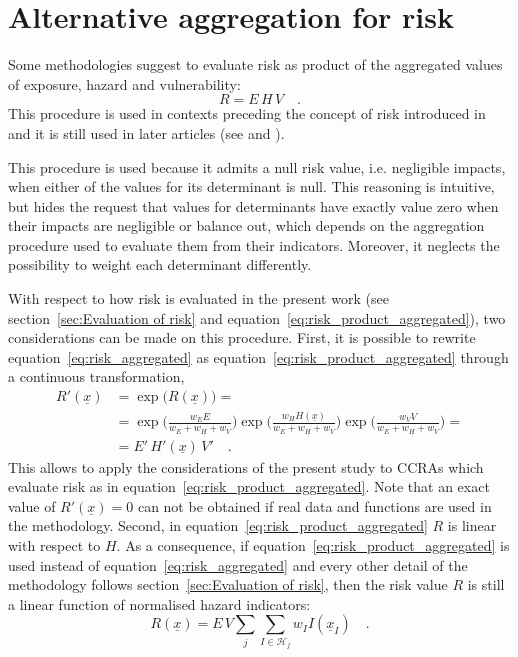 \section{Alternative aggregation for risk}
Some methodologies suggest to evaluate \gls{risk} as product of the aggregated values of \gls{exposure}, \gls{hazard} and \gls{vulnerability}:
\begin{equation}
  \label{eq:risk_product_aggregated}
  R = E \, H \, V
  \quad .
\end{equation}
This procedure is used in contexts preceding the concept of \gls{risk} introduced in \cite{2012FieldManagingThe} and it is still used in later articles (see \cite[7]{2023DeVivoApplicationOf} and \cite[6]{2023DeVivoClimate-RiskAssessment}).

This procedure is used because it admits a null \gls{risk} value, i.e. negligible \glspl{impact}, when either of the values for its \gls{determinant} is null. This reasoning is intuitive, but hides the request that values for \glspl{determinant} have exactly value zero when their \glspl{impact} are negligible or balance out, which depends on the aggregation procedure used to evaluate them from their \glspl{indicator}. Moreover, it neglects the possibility to weight each \gls{determinant} differently.

With respect to how \gls{risk} is evaluated in the present work (see section~\ref{sec:Evaluation of risk} and equation~\eqref{eq:risk_product_aggregated}), two considerations can be made on this procedure.
First, it is possible to rewrite equation~\eqref{eq:risk_aggregated} as equation~\eqref{eq:risk_product_aggregated} through a continuous transformation,
\begin{equation}
  \label{eq:risk_equivalence}
  \begin{split}
    R'(\underline{x}) & = \exp{\big( R(\underline{x}) \big)} = \\
    & = \exp{\bigg( \frac{w_E E}{w_E + w_H + w_V} \bigg)} \exp{\bigg( \frac{w_H H(\underline{x})}{w_E + w_H + w_V} \bigg)} \exp{\bigg( \frac{w_V V}{w_E + w_H + w_V} \bigg)} = \\
    & = E' \, H'(\underline{x}) \, V'
    \quad .
  \end{split}
\end{equation}
This allows to apply the considerations of the present study to \glspl{CCRA} which evaluate \gls{risk} as in equation~\eqref{eq:risk_product_aggregated}. Note that an exact value of $R'(\underline{x}) = 0$ can not be obtained if real data and functions are used in the methodology.
Second, in equation~\eqref{eq:risk_product_aggregated} $R$ is linear with respect to $H$. As a consequence, if equation~\eqref{eq:risk_product_aggregated} is used instead of equation~\eqref{eq:risk_aggregated} and every other detail of the methodology follows section~\ref{sec:Evaluation of risk}, then the \gls{risk} value $R$ is still a linear function of normalised \gls{hazard} \glspl{indicator}:
\begin{equation}
  \label{eq:risk_product_linearity}
  R(\underline{x}) = E \, V \sum_j \sum_{I \in \mathcal{H}_j} w_I I(\underline{x}_I)
  \quad .
\end{equation}
